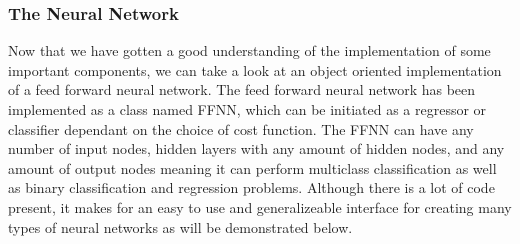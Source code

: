 \documentclass{beamer}
\begin{document}
\begin{frame}
\frametitle{The Neural Network}

Now that we have gotten a good understanding of the implementation of
some important components, we can take a look at an object oriented
implementation of a feed forward neural network. The feed forward
neural network has been implemented as a class named FFNN, which can
be initiated as a regressor or classifier dependant on the choice of
cost function. The FFNN can have any number of input nodes, hidden
layers with any amount of hidden nodes, and any amount of output nodes
meaning it can perform multiclass classification as well as binary
classification and regression problems. Although there is a lot of
code present, it makes for an easy to use and generalizeable interface
for creating many types of neural networks as will be demonstrated
below.

















































































\end{frame}
\end{document}
